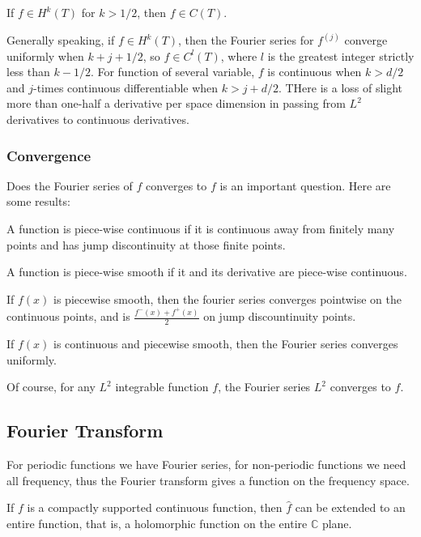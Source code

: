 \documentclass[main.tex]{subfiles}
\begin{document}
\begin{theorem}
If $f \in H^k(T)$ for $k > 1/2$, then $f \in C(T)$.
\end{theorem}

Generally speaking, if $f \in H^k(T)$, then the Fourier series for $f^{(j)}$ converge uniformly when $k + j + 1/2$, so $f \in C^l(T)$, where $l$ is the greatest integer strictly less than $k - 1/2$. For function of several variable, $f$ is continuous when $k > d/2$ and $j$-times continuous differentiable when $k > j + d/2$. THere is a loss of slight more than one-half a derivative per space dimension in passing from $L^2$ derivatives to continuous derivatives.

\subsubsection{Convergence}
Does the Fourier series of $f$ converges to $f$ is an important question. Here are some results:

A function is piece-wise continuous if it is continuous away from finitely many points and has jump discontinuity at those finite points.

A function is piece-wise smooth if it and its derivative are piece-wise continuous.
\begin{theorem}
If $f(x)$ is piecewise smooth, then the fourier series converges pointwise on the continuous points, and is $\frac{f^-(x) + f^+(x)}{2}$ on jump discountinuity points.
\end{theorem}

\begin{theorem}
If $f(x)$ is continuous and piecewise smooth, then the Fourier series converges uniformly.
\end{theorem}

Of course, for any $L^2$ integrable function $f$, the Fourier series $L^2$ converges to $f$.

\subsection{Fourier Transform}
For periodic functions we have Fourier series, for non-periodic functions we need all frequency, thus the Fourier transform gives a function on the frequency space.

If $f$ is a compactly supported continuous function, then $\hat{f}$ can be extended to an entire function, that is, a holomorphic function on the entire $\mathbb{C}$ plane.
\end{document}
